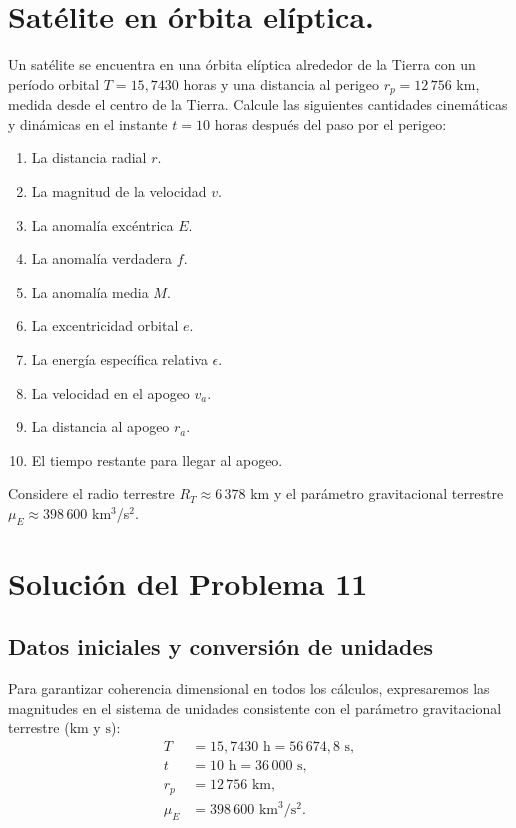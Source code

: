 \documentclass[12pt, a4paper]{article}
\begin{document}
\section{Satélite en órbita elíptica.} Un satélite se encuentra en una órbita elíptica alrededor de la Tierra con un período orbital $T = 15,7430$ horas y una distancia al perigeo $r_p = 12\,756$ km, medida desde el centro de la Tierra. Calcule las siguientes cantidades cinemáticas y dinámicas en el instante $t = 10$ horas después del paso por el perigeo:
\begin{enumerate}
    \item[a)] La distancia radial $r$.
    \item[b)] La magnitud de la velocidad $v$.
    \item[c)] La anomalía excéntrica $E$.
    \item[d)] La anomalía verdadera $f$.
    \item[e)] La anomalía media $M$.
    \item[f)] La excentricidad orbital $e$.
    \item[g)] La energía específica relativa $\epsilon$.
    \item[h)] La velocidad en el apogeo $v_a$.
    \item[i)] La distancia al apogeo $r_a$.
    \item[j)] El tiempo restante para llegar al apogeo.
\end{enumerate}
Considere el radio terrestre $R_T \approx 6\,378$ km y el parámetro gravitacional terrestre $\mu_E \approx 398\,600$ km$^3$/s$^2$.



\section*{Solución del Problema 11}

\subsection*{Datos iniciales y conversión de unidades}
Para garantizar coherencia dimensional en todos los cálculos, expresaremos las magnitudes en el sistema de unidades consistente con el parámetro gravitacional terrestre ($\text{km}$ y $\text{s}$):
\begin{align*}
    T &= 15,7430 \text{ h} = 56\,674,8 \text{ s}, \\
    t &= 10 \text{ h} = 36\,000 \text{ s}, \\
    r_p &= 12\,756 \text{ km}, \\
    \mu_E &= 398\,600 \text{ km}^3/\text{s}^2.
\end{align*}
\end{document}
